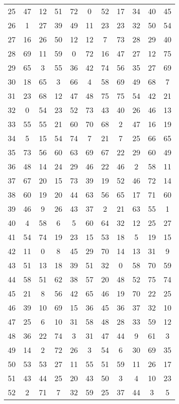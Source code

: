 \begin{table}
\begin{tabular}{c c c c c c c c c c c }
25 & 47 & 12 & 51 & 72 & 0 & 52 & 17 & 34 & 40 & 45 \\
26 & 1 & 27 & 39 & 49 & 11 & 23 & 23 & 32 & 50 & 54 \\
27 & 16 & 26 & 50 & 12 & 12 & 7 & 73 & 28 & 29 & 40 \\
28 & 69 & 11 & 59 & 0 & 72 & 16 & 47 & 27 & 12 & 75 \\
29 & 65 & 3 & 55 & 36 & 42 & 74 & 56 & 35 & 27 & 69 \\
30 & 18 & 65 & 3 & 66 & 4 & 58 & 69 & 49 & 68 & 7 \\
31 & 23 & 68 & 12 & 47 & 48 & 75 & 75 & 54 & 42 & 21 \\
32 & 0 & 54 & 23 & 52 & 73 & 43 & 40 & 26 & 46 & 13 \\
33 & 55 & 55 & 21 & 60 & 70 & 68 & 2 & 47 & 16 & 19 \\
34 & 5 & 15 & 54 & 74 & 7 & 21 & 7 & 25 & 66 & 65 \\
35 & 73 & 56 & 60 & 63 & 69 & 67 & 22 & 29 & 60 & 49 \\
36 & 48 & 14 & 24 & 29 & 46 & 22 & 46 & 2 & 58 & 11 \\
37 & 67 & 20 & 15 & 73 & 39 & 19 & 52 & 46 & 72 & 14 \\
38 & 60 & 19 & 20 & 44 & 63 & 56 & 65 & 17 & 71 & 60 \\
39 & 46 & 9 & 26 & 43 & 37 & 2 & 21 & 63 & 55 & 1 \\
40 & 4 & 58 & 6 & 5 & 60 & 64 & 32 & 12 & 25 & 27 \\
41 & 54 & 74 & 19 & 23 & 15 & 53 & 18 & 5 & 19 & 15 \\
42 & 11 & 0 & 8 & 45 & 29 & 70 & 14 & 13 & 31 & 9 \\
43 & 51 & 13 & 18 & 39 & 51 & 32 & 0 & 58 & 70 & 59 \\
44 & 58 & 51 & 62 & 38 & 57 & 20 & 48 & 52 & 75 & 74 \\
45 & 21 & 8 & 56 & 42 & 65 & 46 & 19 & 70 & 22 & 25 \\
46 & 39 & 10 & 69 & 15 & 36 & 45 & 36 & 37 & 32 & 10 \\
47 & 25 & 6 & 10 & 31 & 58 & 48 & 28 & 33 & 59 & 12 \\
48 & 36 & 22 & 74 & 3 & 31 & 47 & 44 & 9 & 61 & 3 \\
49 & 14 & 2 & 72 & 26 & 3 & 54 & 6 & 30 & 69 & 35 \\
50 & 53 & 53 & 27 & 11 & 55 & 51 & 59 & 11 & 26 & 17 \\
51 & 43 & 44 & 25 & 20 & 43 & 50 & 3 & 4 & 10 & 23 \\
52 & 2 & 71 & 7 & 32 & 59 & 25 & 37 & 44 & 3 & 5 \\

\end{tabular}
\end{table}
